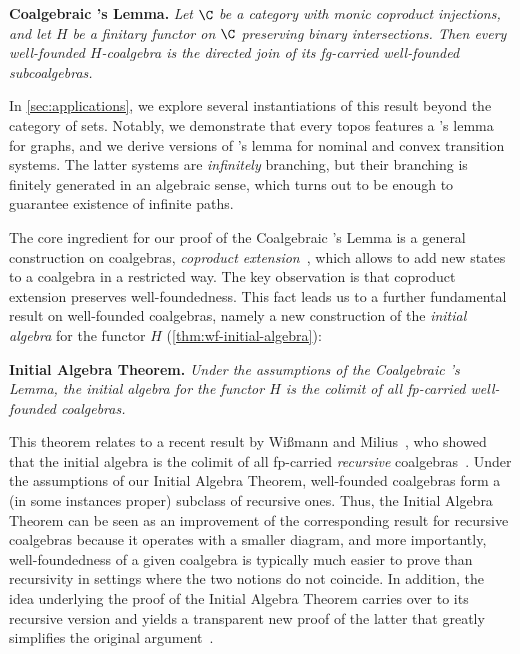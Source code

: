 \medskip\noindent \textsf{\bfseries Coalgebraic \Konig's Lemma.} \emph{Let $\C$ be a \lfplong category with monic coproduct injections, and let $H$ be a finitary functor on $\C$ preserving binary intersections. Then every well-founded $H$-coalgebra is the directed join of its fg-carried well-founded subcoalgebras.}

\medskip\noindent In \autoref{sec:applications}, we explore several instantiations of this result beyond the category of sets. Notably, we demonstrate that every \lfplong topos features a \Konig's lemma for graphs, and we derive versions of \Konig's lemma for nominal and convex transition systems. The latter systems are \emph{infinitely} branching, but their branching is finitely generated in an algebraic sense, which turns out to be enough to guarantee existence of infinite paths.

The core ingredient for our proof of the Coalgebraic \Konig's Lemma is a general construction on coalgebras, \emph{coproduct extension}~\cite{amv06,urbat17,lffiac,mpw16}, which allows to add new states to a coalgebra in a restricted way. The key observation is that coproduct extension preserves well-foundedness. This fact leads us to a further fundamental result on well-founded coalgebras, namely a new construction of the \emph{initial algebra} for the functor $H$ (\autoref{thm:wf-initial-algebra}):

\medskip\noindent \textsf{\bfseries Initial Algebra Theorem.} \emph{Under the assumptions of the Coalgebraic \Konig's Lemma, the initial algebra for the functor $H$ is the colimit of all fp-carried well-founded coalgebras.}

\medskip\noindent This theorem relates to a recent result by Wißmann and Milius~\cite{wm24}, who showed that the initial algebra is the colimit of all fp-carried \emph{recursive} coalgebras~\cite{taylor99}. Under the assumptions of our Initial Algebra Theorem, well-founded coalgebras form a (in some instances proper) subclass of recursive ones. Thus,
the Initial Algebra Theorem can be seen as an improvement of the corresponding result for recursive coalgebras because it operates with a smaller diagram, and more importantly, well-foundedness of a given coalgebra is typically much easier to prove than recursivity in settings where the two notions do not coincide. In addition, the idea underlying the proof of the Initial Algebra Theorem carries over to its recursive version and yields a transparent new proof of the latter that greatly simplifies the original argument~\cite{wm24}.


